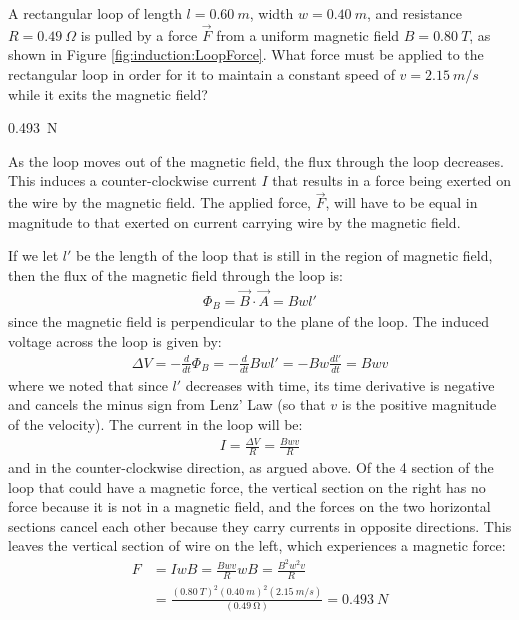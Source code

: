 \question A rectangular loop of length $l=\SI{0.60}{m}$, width $w = \SI{0.40}{m}$, and resistance $R = \SI{0.49}{\Omega}$ is pulled by a force $\vec{F}$ from a uniform magnetic field $B = \SI{0.80}{T}$, as shown in Figure \ref{fig:induction:LoopForce}. What force must be applied to the rectangular loop in order for it to maintain a constant speed of $v = \SI{2.15}{m/s}$ while it exits the magnetic field?
\begin{finalanswer}
\SI{0.493}{N}
\end{finalanswer}
\begin{solution}
As the loop moves out of the magnetic field, the flux through the loop decreases. This induces a counter-clockwise current $I$ that results in a force being exerted on the wire by the magnetic field. The applied force, $\vec F$, will have to be equal in magnitude to that exerted on current carrying wire by the magnetic field.

If we let $l'$ be the length of the loop that is still in the region of magnetic field, then the flux of the magnetic field through the loop is:
\begin{align*}
\Phi_B=\vec B\cdot \vec A=Bwl'
\end{align*}
since the magnetic field is perpendicular to the plane of the loop. The induced voltage across the loop is given by:
\begin{align*}
\Delta V=-\frac{d}{dt}\Phi_B=-\frac{d}{dt}Bwl'=-Bw\frac{dl'}{dt}=Bwv
\end{align*}
where we noted that since $l'$ decreases with time, its time derivative is negative and cancels the minus sign from Lenz' Law (so that $v$ is the positive magnitude of the velocity). The current in the loop will be:
\begin{align*}
I=\frac{\Delta V}{R}=\frac{Bwv}{R}
\end{align*}
and in the counter-clockwise direction, as argued above. Of the 4 section of the loop that could have a magnetic force, the vertical section on the right has no force because it is not in a magnetic field, and the forces on the two horizontal sections cancel each other because they carry currents in opposite directions. This leaves the vertical section of wire on the left, which experiences a magnetic force:
\begin{align*}
F&=IwB=\frac{Bwv}{R}wB=\frac{B^2w^2v}{R}\\
&=\frac{(\SI{0.80}{T})^2(\SI{0.40}{m})^2(\SI{2.15}{m/s})}{(\SI{0.49}{\ohm})}=\SI{0.493}{N}
\end{align*}
\end{solution}

